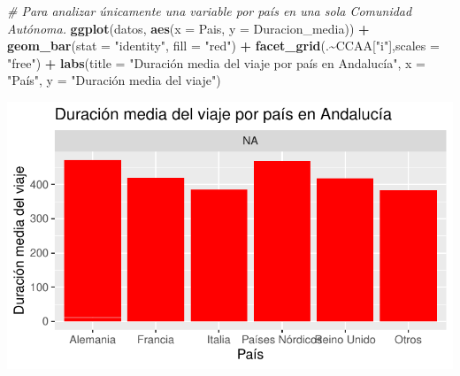 \documentclass[notspecified,article,submit,moreauthors,pdftex]{Definitions/mdpi}
\newenvironment{Shaded}{\begin{snugshade}}{\end{snugshade}}
\newcommand{\AttributeTok}[1]{\textcolor[rgb]{0.13,0.29,0.53}{#1}}
\newcommand{\CommentTok}[1]{\textcolor[rgb]{0.56,0.35,0.01}{\textit{#1}}}
\newcommand{\FunctionTok}[1]{\textcolor[rgb]{0.13,0.29,0.53}{\textbf{#1}}}
\newcommand{\NormalTok}[1]{#1}
\newcommand{\SpecialCharTok}[1]{\textcolor[rgb]{0.81,0.36,0.00}{\textbf{#1}}}
\newcommand{\StringTok}[1]{\textcolor[rgb]{0.31,0.60,0.02}{#1}}
\begin{document}
\begin{Shaded}
\begin{Highlighting}[]
\CommentTok{\# Para analizar únicamente una variable por país en una sola Comunidad Autónoma.}
\FunctionTok{ggplot}\NormalTok{(datos, }\FunctionTok{aes}\NormalTok{(}\AttributeTok{x =}\NormalTok{ Pais, }\AttributeTok{y =}\NormalTok{ Duracion\_media)) }\SpecialCharTok{+} 
  \FunctionTok{geom\_bar}\NormalTok{(}\AttributeTok{stat =} \StringTok{"identity"}\NormalTok{, }\AttributeTok{fill =} \StringTok{"red"}\NormalTok{) }\SpecialCharTok{+}
  \FunctionTok{facet\_grid}\NormalTok{(.}\SpecialCharTok{\textasciitilde{}}\NormalTok{CCAA[}\StringTok{"i"}\NormalTok{],}\AttributeTok{scales =} \StringTok{"free"}\NormalTok{) }\SpecialCharTok{+}
  \FunctionTok{labs}\NormalTok{(}\AttributeTok{title =} \StringTok{"Duración media del viaje por país en Andalucía"}\NormalTok{, }\AttributeTok{x =} \StringTok{"País"}\NormalTok{, }\AttributeTok{y =} \StringTok{"Duración media del viaje"}\NormalTok{)}
\end{Highlighting}
\end{Shaded}

\includegraphics{ProyectoAED2024_Rmd_files/figure-latex/unnamed-chunk-27-3.pdf}
\end{document}
